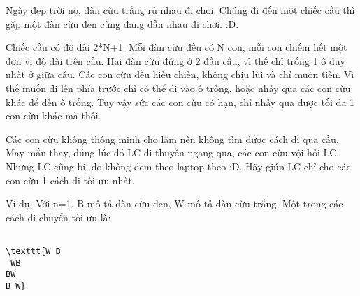 Ngày đẹp trời nọ, đàn cừu trắng rủ nhau đi chơi. Chúng đi đến một chiếc cầu thì gặp một đàn cừu đen cũng đang dẫn nhau đi chơi. :D.

Chiếc cầu có độ dài 2*N+1. Mỗi đàn cừu đều có N con, mỗi con chiếm hết một đơn vị độ dài trên cầu. Hai đàn cừu đứng ở 2 đầu cầu, vì thế chỉ trống 1 ô duy nhất ở giữa cầu. Các con cừu đều hiếu chiến, không chịu lùi và chỉ muốn tiến. Vì thế muốn đi lên phía trước chỉ có thể đi vào ô trống, hoặc nhảy qua các con cừu khác để đến ô trống. Tuy vậy sức các con cừu có hạn, chỉ nhảy qua được tối đa 1 con cừu khác mà thôi.

Các con cừu không thông minh cho lắm nên không tìm được cách đi qua cầu. May mắn thay, đúng lúc đó LC đi thuyền ngang qua, các con cừu vội hỏi LC. Nhưng LC cũng bí, do không đem theo laptop theo :D. Hãy giúp LC chỉ cho các con cừu 1 cách đi tối ưu nhất.

Ví dụ: Với n=1, B mô tả đàn cừu đen, W mô tả đàn cừu trắng. Một trong các cách di chuyển tối ưu là:
\begin{verbatim}

\texttt{W B
 WB
BW 
B W}\end{verbatim}

\
